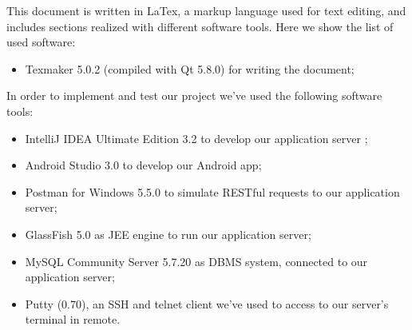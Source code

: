 This document is written in LaTex, a markup language used for text editing, and includes sections realized with different software tools. Here we show the list of used software:
\begin{itemize}
	\item Texmaker 5.0.2 (compiled with Qt 5.8.0) for writing the document;
\end{itemize}
In order to implement and test our project we've used the following software tools:
\begin{itemize}
	\item IntelliJ IDEA Ultimate Edition 3.2 to develop our application server ;
	\item Android Studio 3.0 to develop our Android app;
	\item Postman for Windows 5.5.0 to simulate RESTful requests to our application server;
	\item GlassFish 5.0 as JEE engine to run our application server;
	\item MySQL Community Server 5.7.20 as DBMS system, connected to our application server;
	\item Putty (0.70), an SSH and telnet client we've used to access to our server's terminal in remote.
\end{itemize}